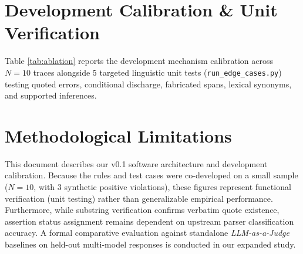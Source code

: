 \documentclass[11pt,a4paper]{article}
\begin{document}
\section{Development Calibration \& Unit Verification}
Table \ref{tab:ablation} reports the development mechanism calibration across $N=10$ traces alongside 5 targeted linguistic unit tests (\texttt{run\_edge\_cases.py}) testing quoted errors, conditional discharge, fabricated spans, lexical synonyms, and supported inferences.

\begin{table}[h!]
\centering
\caption{Development Mechanism Calibration on $N=10$ Traces (3 Synthetic Positives, 7 Negatives)}
\vspace{0.2cm}
\label{tab:ablation}
\end{table}

\section{Methodological Limitations}
This document describes our v0.1 software architecture and development calibration. Because the rules and test cases were co-developed on a small sample ($N=10$, with 3 synthetic positive violations), these figures represent functional verification (unit testing) rather than generalizable empirical performance. Furthermore, while substring verification confirms verbatim quote existence, assertion status assignment remains dependent on upstream parser classification accuracy. A formal comparative evaluation against standalone \textit{LLM-as-a-Judge} baselines on held-out multi-model responses is conducted in our expanded study.
\end{document}
